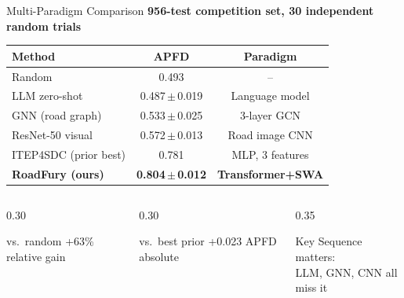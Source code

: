 \documentclass[aspectratio=169,10pt]{beamer}
\begin{document}
\begin{frame}{Multi-Paradigm Comparison}
  \textbf{956-test competition set, 30 independent random trials}
  \vspace{6pt}

  \begin{center}
  \begin{tabular}{lcc}
    \toprule
    \textbf{Method} & \textbf{APFD} & \textbf{Paradigm} \\
    \midrule
    Random                   & 0.493              & -- \\
    LLM zero-shot            & 0.487\,$\pm$\,0.019 & Language model \\
    GNN (road graph)         & 0.533\,$\pm$\,0.025 & 3-layer GCN \\
    ResNet-50 visual         & 0.572\,$\pm$\,0.013 & Road image CNN \\
    ITEP4SDC (prior best)    & 0.781              & MLP, 3 features \\
    \rowcolor{mLightBrown!20}
    \textbf{RoadFury (ours)} & \textbf{0.804\,$\pm$\,0.012} & \textbf{Transformer+SWA} \\
    \bottomrule
  \end{tabular}
  \end{center}

  \vspace{6pt}
  \begin{columns}[T]
    \begin{column}{0.30\linewidth}
      \begin{block}{\small vs.\ random}
        \centering +63\% relative gain
      \end{block}
    \end{column}
    \begin{column}{0.30\linewidth}
      \begin{block}{\small vs.\ best prior}
        \centering +0.023 APFD absolute
      \end{block}
    \end{column}
    \begin{column}{0.35\linewidth}
      \begin{alertblock}{\small Key}
        Sequence matters:\\LLM, GNN, CNN all miss it
      \end{alertblock}
    \end{column}
  \end{columns}
\end{frame}
\end{document}
